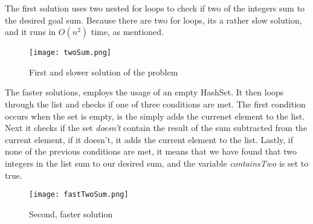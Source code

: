 \documentclass{article}
\begin{document}
The first solution uses two nested for loops to check if two of the integers sum to the desired goal sum. Because there are two for loops, its a rather slow solution, and it runs in \( O\left( n^2 \right) \) time, as mentioned.

\begin{figure}[H]
    \begin{center}
        \texttt{[image: twoSum.png]}
    \end{center}
    \caption{First and slower solution of the problem}
    \label{fig:twoSum.png}
\end{figure}

The faster solutions, employs the usage of an empty HashSet. It then loops through the list and checks if one of three conditions are met. The first condition occurs when the set is empty, is the simply adds the currenet element to the list. Next it checks if the set \textit{doesn't} contain the result of the sum subtracted from the current element, if it doesn't, it adds the current element to the list. Lastly, if none of the previous conditions are met, it means that we have found that two integers in the list sum to our desired sum, and the variable \textit{containsTwo} is set to true.

\begin{figure}[H]
    \begin{center}
        \texttt{[image: fastTwoSum.png]}
    \end{center}
    \caption{Second, faster solution}
    \label{fig:fastTwoSum.png}
\end{figure}

\begin{center}
\end{center}
\end{document}
